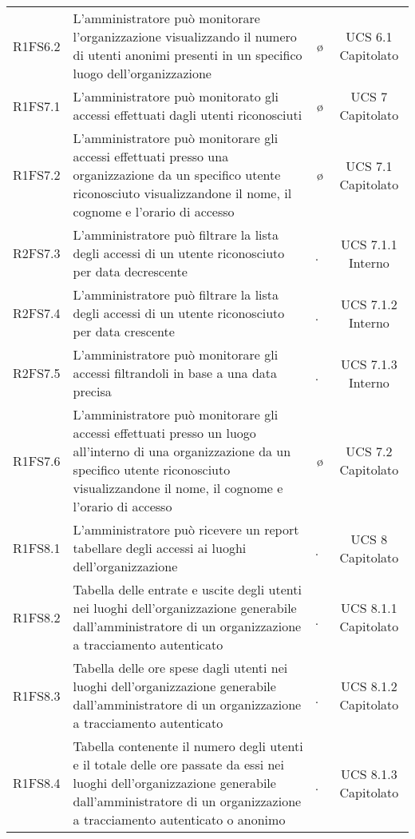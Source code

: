 {\begin{longtable}{ c C{4cm} c c}
R1FS6.2 & L'amministratore può monitorare l'organizzazione visualizzando il numero di utenti anonimi presenti in un specifico luogo dell'organizzazione  & \o & UCS 6.1 Capitolato\\

R1FS7.1 & L'amministratore può monitorato gli accessi effettuati dagli utenti riconosciuti & \o & UCS 7 Capitolato\\

R1FS7.2 & L'amministratore può monitorare gli accessi effettuati presso una organizzazione da un specifico utente riconosciuto visualizzandone il nome, il cognome e l'orario di accesso & \o & UCS 7.1 Capitolato\\

R2FS7.3 & L’amministratore può filtrare la lista degli accessi di un utente riconosciuto per data decrescente & \d & UCS 7.1.1 Interno \\

R2FS7.4 & L’amministratore può filtrare la lista degli accessi di un utente riconosciuto per data crescente & \d & UCS 7.1.2 Interno \\

R2FS7.5 & L'amministratore può monitorare gli accessi filtrandoli in base a una data precisa & \d & UCS 7.1.3 Interno\\

R1FS7.6 & L'amministratore può monitorare gli accessi effettuati presso un luogo all'interno di una organizzazione da un specifico utente riconosciuto visualizzandone il nome, il cognome e l'orario di accesso & \o & UCS 7.2 Capitolato\\

R1FS8.1 & L'amministratore può ricevere un report tabellare degli accessi ai luoghi dell'organizzazione & \d & UCS 8 Capitolato\\

R1FS8.2 &  Tabella delle entrate e uscite degli utenti nei luoghi dell'organizzazione generabile dall'amministratore di un organizzazione a tracciamento autenticato & \d & UCS 8.1.1 Capitolato\\

R1FS8.3 & Tabella delle ore spese dagli utenti nei luoghi dell'organizzazione generabile dall'amministratore di un organizzazione a tracciamento autenticato & \d & UCS 8.1.2 Capitolato\\

R1FS8.4 & Tabella contenente il numero degli utenti e il totale delle ore passate da essi nei luoghi dell'organizzazione generabile dall'amministratore di un organizzazione a tracciamento autenticato o anonimo & \d & UCS 8.1.3 Capitolato\\


\end{longtable}}

